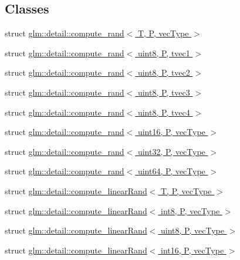 \subsection*{Classes}
\begin{DoxyCompactItemize}
\item 
struct \hyperlink{structglm_1_1detail_1_1compute__rand}{glm\-::detail\-::compute\-\_\-rand$<$ T, P, vec\-Type $>$}
\item 
struct \hyperlink{structglm_1_1detail_1_1compute__rand_3_01uint8_00_01_p_00_01tvec1_01_4}{glm\-::detail\-::compute\-\_\-rand$<$ uint8, P, tvec1 $>$}
\item 
struct \hyperlink{structglm_1_1detail_1_1compute__rand_3_01uint8_00_01_p_00_01tvec2_01_4}{glm\-::detail\-::compute\-\_\-rand$<$ uint8, P, tvec2 $>$}
\item 
struct \hyperlink{structglm_1_1detail_1_1compute__rand_3_01uint8_00_01_p_00_01tvec3_01_4}{glm\-::detail\-::compute\-\_\-rand$<$ uint8, P, tvec3 $>$}
\item 
struct \hyperlink{structglm_1_1detail_1_1compute__rand_3_01uint8_00_01_p_00_01tvec4_01_4}{glm\-::detail\-::compute\-\_\-rand$<$ uint8, P, tvec4 $>$}
\item 
struct \hyperlink{structglm_1_1detail_1_1compute__rand_3_01uint16_00_01_p_00_01vec_type_01_4}{glm\-::detail\-::compute\-\_\-rand$<$ uint16, P, vec\-Type $>$}
\item 
struct \hyperlink{structglm_1_1detail_1_1compute__rand_3_01uint32_00_01_p_00_01vec_type_01_4}{glm\-::detail\-::compute\-\_\-rand$<$ uint32, P, vec\-Type $>$}
\item 
struct \hyperlink{structglm_1_1detail_1_1compute__rand_3_01uint64_00_01_p_00_01vec_type_01_4}{glm\-::detail\-::compute\-\_\-rand$<$ uint64, P, vec\-Type $>$}
\item 
struct \hyperlink{structglm_1_1detail_1_1compute__linear_rand}{glm\-::detail\-::compute\-\_\-linear\-Rand$<$ T, P, vec\-Type $>$}
\item 
struct \hyperlink{structglm_1_1detail_1_1compute__linear_rand_3_01int8_00_01_p_00_01vec_type_01_4}{glm\-::detail\-::compute\-\_\-linear\-Rand$<$ int8, P, vec\-Type $>$}
\item 
struct \hyperlink{structglm_1_1detail_1_1compute__linear_rand_3_01uint8_00_01_p_00_01vec_type_01_4}{glm\-::detail\-::compute\-\_\-linear\-Rand$<$ uint8, P, vec\-Type $>$}
\item 
struct \hyperlink{structglm_1_1detail_1_1compute__linear_rand_3_01int16_00_01_p_00_01vec_type_01_4}{glm\-::detail\-::compute\-\_\-linear\-Rand$<$ int16, P, vec\-Type $>$}

\end{DoxyCompactItemize}
